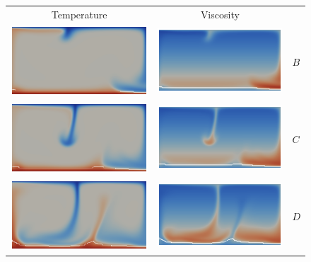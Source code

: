 \begin{figure}[htbp]
\begin{center}
\begin{tabular}{c c l}
Temperature & Viscosity \\
\includegraphics[width=0.45\columnwidth]{chapters/vynnytska/figures/tmB.png} &
\includegraphics[width=0.45\columnwidth]{chapters/vynnytska/figures/visB.png} & $B$ \\
\includegraphics[width=0.45\columnwidth]{chapters/vynnytska/figures/tmC.png} &
\includegraphics[width=0.45\columnwidth]{chapters/vynnytska/figures/visC.png} & $C$ \\
\includegraphics[width=0.45\columnwidth]{chapters/vynnytska/figures/tmD.png} &
\includegraphics[width=0.45\columnwidth]{chapters/vynnytska/figures/visD.png} & $D$ \\

\end{tabular}
\end{center}
\end{figure}
